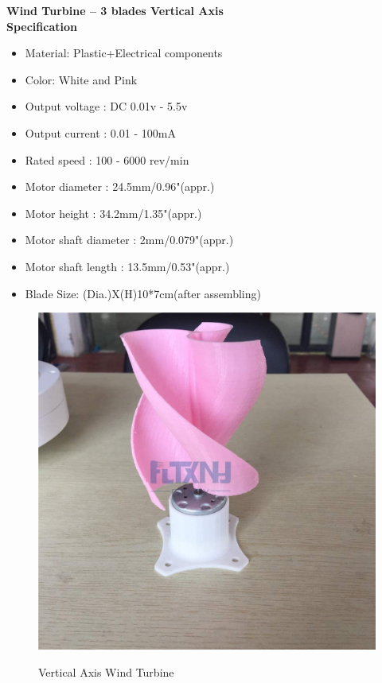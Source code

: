 \documentclass[a4paper,12pt]{article}
\begin{document}
\newpage
\textbf{Wind Turbine – 3 blades Vertical Axis}\\[1cm]
\textbf{Specification}
\begin{itemize}
\item Material: Plastic+Electrical components
\item Color: White and Pink
\item Output voltage : DC 0.01v - 5.5v
\item Output current : 0.01 - 100mA
\item Rated speed : 100 - 6000 rev/min
\item Motor diameter : 24.5mm/0.96"(appr.)
\item Motor height : 34.2mm/1.35"(appr.)
\item Motor shaft diameter : 2mm/0.079"(appr.)
\item Motor shaft length : 13.5mm/0.53"(appr.)
\item Blade Size: (Dia.)X(H)10*7cm(after assembling)
\end{itemize}
\begin{figure}[!h]
\centering
\includegraphics[scale=0.2]{wt.jpg}\\
\caption{Vertical Axis Wind Turbine}
\end{figure}
\end{document}
